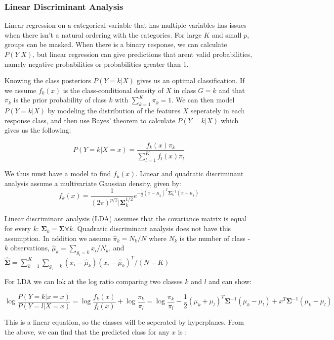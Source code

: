 \documentclass[12pt,twoside]{reedthesis}
\theoremstyle{definition}
\theoremstyle{definition}
\theoremstyle{definition}
\theoremstyle{remark}
\begin{document}
\subsubsection{Linear Discriminant
Analysis}\label{linear-discriminant-analysis}

Linear regression on a categorical variable that has multiple variables
has issues when there isn't a natural ordering with the categories. For
large \(K\) and small \(p\), groups can be masked. When there is a
binary response, we can calculate \(P(Y|X)\), but linear regression can
give predictions that arent valid probabilities, namely negative
probabilities or probabilities greater than 1.

Knowing the class posteriors \(P(Y = k|X)\) gives us an optimal
classification. If we assume \(f_k(x)\) is the class-conditional density
of \(X\) in class \(G = k\) and that \(\pi_k\) is the prior probability
of class \(k\) with \(\sum_{k=1}^K \pi_k = 1\). We can then model
\(P(Y = k | X)\) by modeling the distribution of the features \(X\)
seperately in each response class, and then use Bayes' theorem to
calculate \(P(Y = k |X)\) which gives us the following:

\[ P(Y = k | X = x) = \frac{f_k(x)\pi_k}{\sum_{l = 1}^Kf_l(x)\pi_l}\]

We thus must have a model to find \(f_k(x)\). Linear and quadratic
discriminant analysis assume a multivariate Gaussian density, given by:
\[f_k(x) = \frac{1}{(2\pi)^{p/2}|\mathbf{\Sigma}_k^{1/2}}e^{-\frac{1}{2}(x-\mu_k)^T\mathbf{\Sigma}_k^{-1}(x - \mu_k)}\]

Linear discriminant analysis (LDA) assumes that the covariance matrix is
equal for every \(k\):
\(\mathbf{\Sigma}_k = \mathbf{\Sigma} \forall k\). Quadratic
discriminant analysis does not have this assumption. In addition we
assume \(\hat{\pi}_k = N_k/N\) where \(N_k\) is the number of class -
\(k\) observations, \(\hat{\mu}_k = \sum_{g_i = k}x_i/N_k\), and
\(\mathbf{\hat{\Sigma}} = \sum_{k = 1}^{K}\sum_{g_i = k}(x_i - \hat \mu_k)(x_i - \hat\mu_k)^T / (N- K)\)

For LDA we can lok at the log ratio comparing two classes \(k\) and
\(l\) and can show:

\[\log\frac{P(Y= k|x = x)}{P(Y = l|X = x)} = \log\frac{f_k(x)}{f_l(x)} + \log\frac{\pi_k}{\pi_l} = \log \frac{\pi_k}{\pi_l} - \frac{1}{2}(\mu_k + \mu_l)^T\mathbf{\Sigma}^{-1}(\mu_k- \mu_l) + x^T\mathbf{\Sigma}^{-1}(\mu_k - \mu_l) \]

This is a linear equation, so the classes will be seperated by
hyperplanes. From the above, we can find that the predicted class for
any \(x\) is :
\end{document}
